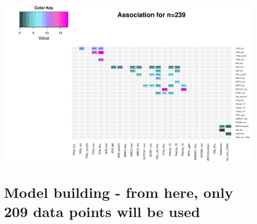 \documentclass[a4paper,11pt]{article}
\begin{document}
\includegraphics{HICF1_Finalreportv4-009}
\section{Model building - from here, only 209 data points will be used}
% 
% 
\end{document}
